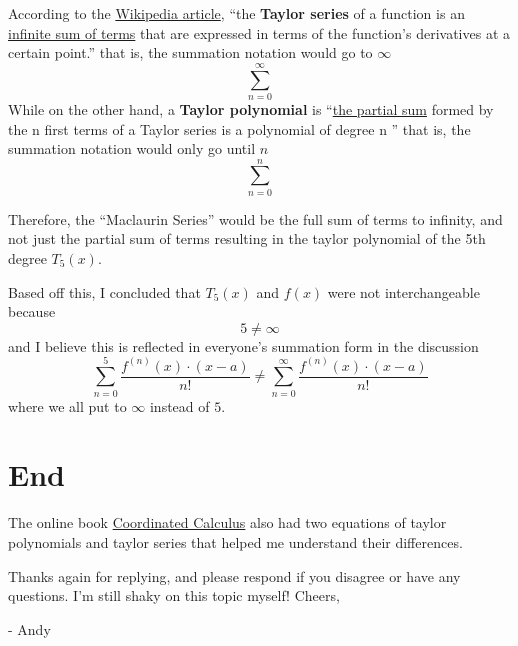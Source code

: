 \documentclass[12pt]{article}
\begin{document}
According to the \href{https://en.wikipedia.org/wiki/Taylor_series}{Wikipedia article}, ``the \textbf{Taylor series} of a function is an \uline{infinite sum of terms} that are expressed in terms of the function's derivatives at a certain point.''
that is, the summation notation would go to $\infty$
$$
  \sum_{n=0}^{\infty}
$$
While on the other hand, a \textbf{Taylor polynomial} is ``\uline{the partial sum} formed by the n first terms of a Taylor series is a polynomial of degree n ''
that is, the summation notation would only go until $n$
$$
  \sum_{n=0}^{n}
$$

Therefore, the ``Maclaurin Series'' would be the full sum of terms to infinity, and not just the partial sum of terms resulting in the taylor polynomial of the 5th degree $T_{5}(x)$. 

Based off this, I concluded that $T_{5}(x)$ and $f(x)$ were not interchangeable because
$$5\neq\infty$$
and I believe this is reflected in everyone's summation form in the discussion
$$
  \sum_{n=0}^{5}\frac{f^{\left(n\right)}\left(x\right)\cdot\left(x-a\right)}{n!}\neq\sum_{n=0}^{\infty}\frac{f^{\left(n\right)}\left(x\right)\cdot\left(x-a\right)}{n!}
$$
where we all put to $\infty$ instead of $5$.

\section{End}
The online book \href{https://mathbooks.unl.edu/Calculus/sec-7-6-taylor.html}{Coordinated Calculus} also had two equations of taylor polynomials and taylor series that helped me understand their differences.

Thanks again for replying, and please respond if you disagree or have any questions. I'm still shaky on this topic myself!
\bigbreak
Cheers,

- Andy
\end{document}
